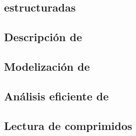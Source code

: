 




\subsection{\Transacciones estructuradas}
\label{sec:clasificacion:transacciones-tipo-ii:transacciones-estructuradas}





\subsection{Descripción de \mushroom}
\label{sec:clasificacion:transacciones-tipo-ii:descripcion-de-mushroom}





\subsection{Modelización de \Registros}
\label{sec:clasificacion:transacciones-tipo-ii:modelizacion}





\subsection{Análisis eficiente de \Registros}
\label{sec:clasificacion:transacciones-tipo-ii:analisis-eficiente}





\subsection{Lectura de \datasets comprimidos}
\label{sec:clasificacion:transacciones-tipo-ii:lectura}

